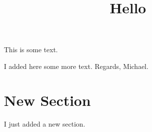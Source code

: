 \documentclass{article}
\title{Hello}
\begin{document}
\maketitle
	
This is some text.

I added here some more text.
Regards, Michael.

\section{New Section}

I just added a new section.
\end{document}
